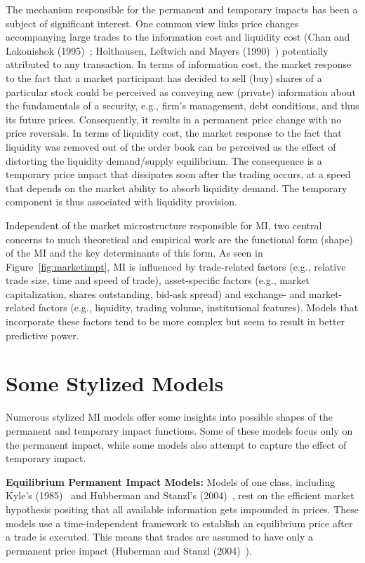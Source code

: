 The mechanism responsible for the permanent and temporary impacts has been a subject of significant interest. One common view links price changes accompanying large trades to the information cost and liquidity cost (Chan and Lakonishok (1995)~\cite{chan1995}; Holthausen, Leftwich and Mayers (1990)~\cite{holthausen1990}) potentially attributed to any transaction. In terms of information cost, the market response to the fact that a market participant has decided to sell (buy) shares of a particular stock could be perceived as conveying new (private) information about the fundamentals of a security, e.g., firm's management, debt conditions, and thus its future prices. Consequently, it results in a permanent price change with no price reversals. In terms of liquidity cost, the market response to the fact that liquidity was removed out of the order book can be perceived as the effect of distorting the liquidity demand/supply equilibrium. The consequence is a temporary price impact that dissipates soon after the trading occurs, at a speed that depends on the market ability to absorb liquidity demand. The temporary component is thus associated with liquidity provision. 


Independent of the market microstructure responsible for MI, two central concerns to much theoretical and empirical work are the functional form (shape) of the MI and the key determinants of this form. As seen in Figure~\ref{fig:marketimpt}, MI is influenced by trade-related factors (e.g., relative trade size, time and speed of trade), asset-specific factors (e.g., market capitalization, shares outstanding, bid-ask spread) and exchange- and market-related factors (e.g., liquidity, trading volume, institutional features). Models that incorporate these factors tend to be more complex but seem to result in better predictive power.


\section{Some Stylized Models}	

Numerous stylized MI models offer some insights into possible shapes of the permanent and temporary impact functions. Some of these models focus only on the permanent impact, while some models also attempt to capture the effect of temporary impact. \twomedskip


\noindent \textbf{Equilibrium Permanent Impact Models:} Models of one class, including Kyle's (1985)~\cite{kyle1985} and Hubberman and Stanzl's (2004)~\cite{huberstan}, rest on the efficient market hypothesis positing that all available information gets impounded in prices. These models use a time-independent framework to establish an equilibrium price after a trade is executed. This means that trades are assumed to have only a permanent price impact (Huberman and Stanzl (2004)~\cite[p.1260]{huberstan}).


